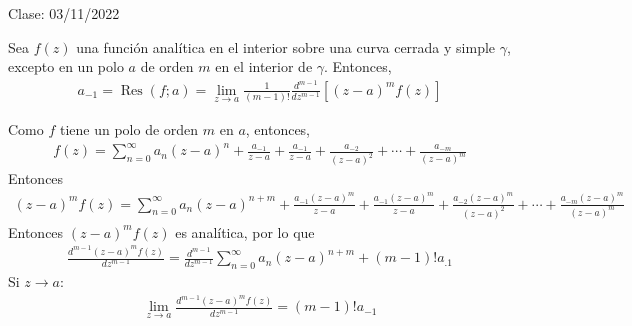 Clase: 03/11/2022

\begin{teorema}
    Sea $f(z)$ una función analítica en el interior sobre una curva cerrada y simple $\gamma$, excepto en un polo $a$ de orden $m$ en el interior de $\gamma$. Entonces, 
    \begin{align*}
        a_{-1}=\operatorname{Res}(f;a) = \lim_{z\to a}\frac{1}{(m-1)!}\frac{d^{m-1}}{dz^{m-1}}\left[(z-a)^m f(z)\right]
    \end{align*}
    \begin{dem}
        Como $f$ tiene un polo de orden $m$ en $a$, entonces,
        \begin{align*}
            f(z)=\sum_{n=0}^\infty a_n(z-a)^n +\frac{a_{-1}}{z-a}+\frac{a_{-1}}{z-a}+\frac{a_{-2}}{(z-a)^{2}}+\cdots+\frac{a_{-m}}{(z-a)^m} 
        \end{align*}
        Entonces 
        \begin{align*}
            (z-a)^m f(z)= \sum_{n=0}^\infty a_n(z-a)^{n+m} +\frac{a_{-1}(z-a)^m}{z-a}+\frac{a_{-1}(z-a)^m}{z-a}+\frac{a_{-2}(z-a)^m}{(z-a)^{2}}+\cdots+\frac{a_{-m}(z-a)^m}{(z-a)^m} 
        \end{align*}
        Entonces $(z-a)^mf(z)$ es analítica, por lo que
        \begin{align*}
            \frac{d^{m-1}(z-a)^m f(z)}{dz^{m-1}} = \frac{d^{m-1}}{dz^{m-1}}\sum_{n=0}^\infty a_n (z-a)^{n+m}+(m-1)!a_{.1}
        \end{align*}
        Si $z\to a$:
        \begin{align*}
            \lim_{z\to a} \frac{d^{m-1}(z-a)^m f(z)}{dz^{m-1}} =(m-1)!a_{-1}
        \end{align*}
    \end{dem}
\end{teorema}

